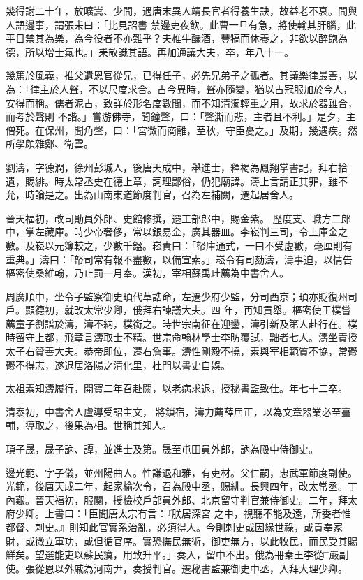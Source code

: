 \begin{pinyinscope}
 幾得謝二十年，放曠嵩、少間，遇唐末異人靖長官者得養生訣，故益老不衰。間與人語邊事，謂張耒曰：「比見詔書
 禁邊吏夜飲。此曹一旦有急，將使輸其肝腦，此平日禁其為樂，為今役者不亦難乎？夫椎牛釃酒，豐犒而休養之，非欲以醉飽為德，所以增士氣也。」耒敬識其語。再加通議大夫，卒，年八十一。



 幾篤於風義，推父遺恩官從兄，已得任子，必先兄弟子之孤者。其議樂律最善，以為：「律主於人聲，不以尺度求合。古今異時，聲亦隨變，猶以古冠服加於今人，安得而稱。儒者泥古，致詳於形名度數間，而不知清濁輕重之用，故求於器雖合，而考於聲則
 不諧。」嘗游佛寺，聞鐘聲，曰：「聲澌而悲，主者且不利。」是夕，主僧死。在保州，聞角聲，曰：「宮微而商離，至秋，守臣憂之。」及期，幾遇疾。然所學頗雜鄭、衛雲。



 劉濤，字德潤，徐州彭城人，後唐天成中，舉進士，釋褐為鳳翔掌書記，拜右拾遺，賜緋。時太常丞史在德上章，詞理鄙俗，仍犯廟諱。濤上言請正其罪，雖不允，時論是之。出為山南東道節度判官，召為左補闕，遷起居舍人。



 晉天福初，改司勛員外郎、史館修撰，遷工部郎中，賜金紫。
 歷度支、職方二郎中，掌左藏庫。時少帝奢侈，常以銀易金，廣其器皿。李崧判三司，令上庫金之數。及崧以元簿較之，少數千鎰。崧責曰：「帑庫通式，一曰不受虛數，毫厘則有重典。」濤曰：「帑司常有報不盡數，以備宣索。」崧令有司劾濤，濤事迫，以情告樞密使桑維翰，乃止罰一月奉。漢初，宰相蘇禹珪薦為中書舍人。



 周廣順中，坐令子監察御史頊代草誥命，左遷少府少監，分司西京；頊亦貶復州司戶。顯德初，就改太常少卿，俄拜右諫議大夫。四
 年，再知貢舉。樞密使王樸嘗薦童子劉譜於濤，濤不納，樸銜之。時世宗南征在迎鑾，濤引新及第人赴行在。樸時留守上都，飛章言濤取士不精。世宗命翰林學士李昉覆試，黜者七人。濤坐責授太子右贊善大夫。恭帝即位，遷右詹事。濤性剛毅不撓，素與宰相範質不協，常鬱鬱不得志，遂退居洛陽之清化里，杜門以書史自娛。



 太祖素知濤履行，開寶二年召赴闕，以老病求退，授秘書監致仕。年七十二卒。



 清泰初，中書舍人盧導受詔主文，
 將鎖宿，濤力薦薛居正，以為文章器業必至臺輔，導取之，後果為相。世稱其知人。



 頊子晟，晟子訥、譚，並進士及第。晟至屯田員外郎，訥為殿中侍御史。



 邊光範、字子儀，並州陽曲人。性謙退和雅，有吏材。父仁嗣，忠武軍節度副使。光範，後唐天成二年，起家榆次令，召為殿中丞，賜緋。長興四年，改太常丞。丁內艱。晉天福初，服闋，授檢校戶部員外郎、北京留守判官兼侍御史。二年，拜太府少卿。上書曰：「臣聞唐太宗有言：『朕居深宮
 之中，視聽不能及遠，所委者惟都督、刺史。』則知此官實系治亂，必須得人。今則刺史或因緣世祿，或貢奉家財，或微立軍功，或但循官序。實恐撫民無術，御吏無方，以此牧民，而民受其賜鮮矣。望選能吏以蘇民瘼，用致升平。」奏入，留中不出。俄為冊秦王李從□嚴副使。張從恩以外戚為河南尹，奏授判官。遷秘書監兼御史中丞，入拜大理少卿。




\end{pinyinscope}
